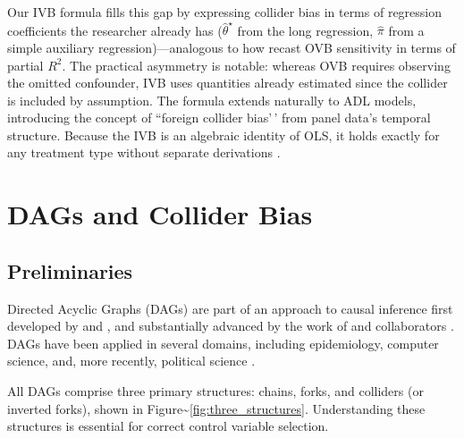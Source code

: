\documentclass[
]{article}
\begin{document}
Our IVB formula fills this gap by expressing collider bias in terms of
regression coefficients the researcher already has
(\(\hat\theta^{\star}\) from the long regression, \(\hat\pi\) from a
simple auxiliary regression)---analogous to how
\citet{cinelli2020making} recast OVB sensitivity in terms of partial
\(R^2\). The practical asymmetry is notable: whereas OVB requires
observing the omitted confounder, IVB uses quantities already estimated
since the collider is included by assumption. The formula extends
naturally to ADL models, introducing the concept of ``foreign collider
bias'\,' from panel data's temporal structure. Because the IVB is an
algebraic identity of OLS, it holds exactly for any treatment type
without separate derivations \citep{ding2015adjust}.

\section{\texorpdfstring{DAGs and Collider Bias
\label{sec:dags}}{DAGs and Collider Bias }}\label{dags-and-collider-bias}

\subsection{Preliminaries}\label{preliminaries}

Directed Acyclic Graphs (DAGs) are part of an approach to causal
inference first developed by \citet{wright1928tariff} and
\citet{wright1934method}, and substantially advanced by the work of
\citet{pearl2009causality} and collaborators \citep{pearl2018book}. DAGs
have been applied in several domains, including epidemiology, computer
science, and, more recently, political science
\citep{imbens2020potential}.

All DAGs comprise three primary structures: chains, forks, and colliders
(or inverted forks), shown in
Figure\textasciitilde{}\ref{fig:three_structures}. Understanding these
structures is essential for correct control variable selection.
\end{document}
